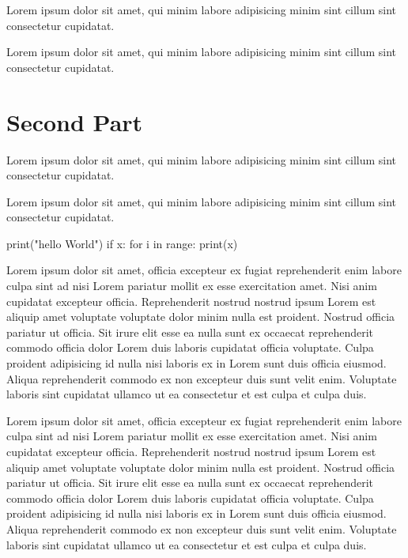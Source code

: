 Lorem ipsum dolor sit amet, qui minim labore adipisicing minim sint cillum sint
consectetur cupidatat.


Lorem ipsum dolor sit amet, qui minim labore adipisicing minim sint cillum sint
consectetur cupidatat.

\section{Second Part}

Lorem ipsum dolor sit amet, qui minim labore adipisicing minim sint cillum sint
consectetur cupidatat.

Lorem ipsum dolor sit amet, qui minim labore adipisicing minim sint cillum sint
consectetur cupidatat.

\vspace{2mm}
\begin{code}[language=Python]
  print("hello World")
  if x:
    for i in range:
      print(x)
\end{code}
\vspace{0mm}

Lorem ipsum dolor sit amet, officia excepteur ex fugiat reprehenderit enim
labore culpa sint ad nisi Lorem pariatur mollit ex esse exercitation amet. Nisi
anim cupidatat excepteur officia. Reprehenderit nostrud nostrud ipsum Lorem est
aliquip amet voluptate voluptate dolor minim nulla est proident. Nostrud officia
pariatur ut officia. Sit irure elit esse ea nulla sunt ex occaecat reprehenderit
commodo officia dolor Lorem duis laboris cupidatat officia voluptate. Culpa
proident adipisicing id nulla nisi laboris ex in Lorem sunt duis officia
eiusmod. Aliqua reprehenderit commodo ex non excepteur duis sunt velit enim.
Voluptate laboris sint cupidatat ullamco ut ea consectetur et est culpa et
culpa duis.

Lorem ipsum dolor sit amet, officia excepteur ex fugiat reprehenderit enim
labore culpa sint ad nisi Lorem pariatur mollit ex esse exercitation amet. Nisi
anim cupidatat excepteur officia. Reprehenderit nostrud nostrud ipsum Lorem est
aliquip amet voluptate voluptate dolor minim nulla est proident. Nostrud officia
pariatur ut officia. Sit irure elit esse ea nulla sunt ex occaecat reprehenderit
commodo officia dolor Lorem duis laboris cupidatat officia voluptate. Culpa
proident adipisicing id nulla nisi laboris ex in Lorem sunt duis officia
eiusmod. Aliqua reprehenderit commodo ex non excepteur duis sunt velit enim.
Voluptate laboris sint cupidatat ullamco ut ea consectetur et est culpa et
culpa duis.


